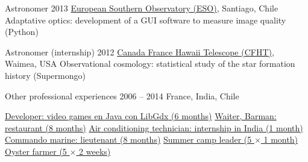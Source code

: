 \begin{joblist}[\tbfwidth][8.4][\tbfyeary]
\item[Astronomer]{2013}
  {
  \href{http://www.eso.org/public/}{European Southern Observatory (ESO)}, Santiago, Chile
  }
  {Adaptative optics: development of a GUI software to measure image quality (Python)}


\item[Astronomer (internship)]{2012}
  {
  \href{https://www.cfht.hawaii.edu/}{Canada France Hawaii Telescope (CFHT)}, Waimea, USA
  }
  {Observational cosmology: statistical study of the star formation history (Supermongo)}


\item[Other professional experiences]{2006 -- 2014}
  {
  France, India, Chile
  }
  {
    \renewcommand\labelitemi{{}}
    \vspace{-0.5cm}
    \normalsize
    \begin{itemize}[leftmargin=*, label=\textbullet]
    \setlength\itemsep{-0.3cm}


    \cvitem \href{https://tinmarino.github.io}{Developer: video games en Java con \href{https://libgdx.com/}{LibGdx} (6 months)}
    \cvitem \href{http://www.insertcoin.cl/}{Waiter, Barman: restaurant (8 months)}
    \cvitem \href{http://www.dupont.co.in/}{Air conditioning technician: internship in India (1 month)}
    \cvitem \href{http://www.defense.gouv.fr/marine/organisation/forces/fusiliers-marins-et-commandos/force-maritime-des-fusiliers-marins-et-commandos}{Commando marine: lieutenant (8 months)}
    \cvitem \href{http://www.vacances-pour-tous.org/}{Summer camp leader (5 $\times$ 1 month)}
    \cvitem \href{http://huitresdesaintvaast.fr/}{Oyster farmer (5 $\times$ 2 weeks)}


    \end{itemize}
  }
\end{joblist}


\ifx\HCode\undefined
\else
\fi




